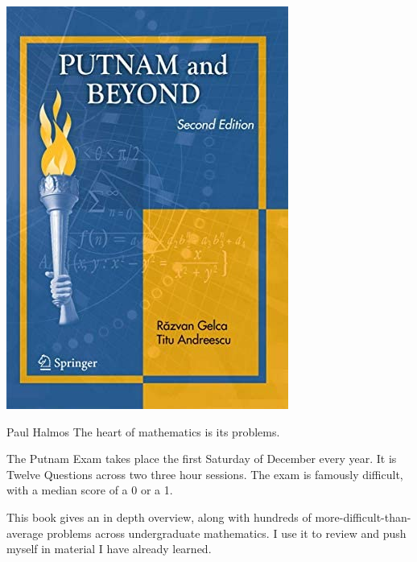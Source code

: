 \begin{boxResource}[lefthand width=5cm, sidebyside]{}
\includegraphics[width=\textwidth]{./img/Gelca_Putnam}
\tcblower
    \begin{boxQuote}{Paul Halmos}
    The heart of mathematics is its problems.
    \end{boxQuote}
    The Putnam Exam takes place the first Saturday of December every year.
    It is Twelve Questions across two three hour sessions.
    The exam is famously difficult, with a median score of a 0 or a 1.

    This book gives an in depth overview,
        along with hundreds of more-difficult-than-average problems across undergraduate mathematics.
    I use it to review and push myself in material I have already learned.
\end{boxResource}
%
